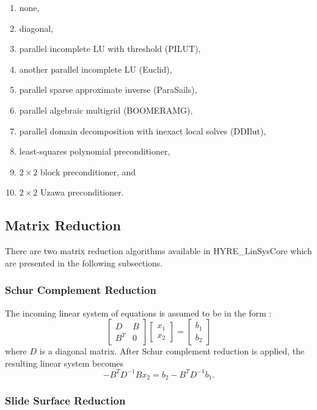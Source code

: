 \begin{enumerate}
\item none,
\item diagonal, 
\item parallel incomplete LU with threshold (PILUT),
\item another parallel incomplete LU (Euclid),
\item parallel sparse approximate inverse (ParaSails),
\item parallel algebraic multigrid (BOOMERAMG),
\item parallel domain decomposition with inexact local solves (DDIlut), 
\item least-squares polynomial preconditioner,
\item $2 \times 2$ block preconditioner, and
\item $2 \times 2$ Uzawa preconditioner.
\end{enumerate}

\subsection{Matrix Reduction} 

There are two matrix reduction algorithms available in {\sf HYRE\_LinSysCore} 
which are presented in the following subsections.

\subsubsection{Schur Complement Reduction}

The incoming linear system of equations is assumed to be in the form :
\[ \left[ 
\begin{array}{cc} 
   D   & B \\
   B^T & 0
\end{array}
  \right] 
  \left[
\begin{array}{c} 
   x_1 \\
   x_2
\end{array}
  \right] 
  =
  \left[
\begin{array}{c} 
   b_1 \\
   b_2
\end{array}
  \right] 
\]
where $D$ is a diagonal matrix.  After Schur complement reduction is applied, 
the resulting linear system becomes
$$
- B^T D^{-1} B x_2 = b_2 - B^T D^{-1} b_1.
$$

\subsubsection{Slide Surface Reduction}

